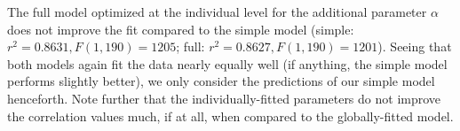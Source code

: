 \documentclass[11pt,a4paper]{article}
\newcommand{\gcs}[1]{\textcolor{blue}{[gcs: #1]}}
\begin{document}
The full model optimized at the individual level for the additional parameter $\alpha$ does not improve the fit compared to the simple model (simple: $r^{2}=0.8631, F(1,190) = 1205$; full: $r^{2}=0.8627, F(1,190) = 1201$). 
Seeing that both models again fit the data nearly equally well (if anything, the simple model performs slightly better), we only consider the predictions of our simple model henceforth.
Note further that the individually-fitted parameters do not improve the correlation values much, if at all, when compared to the globally-fitted model. 







\end{document}
